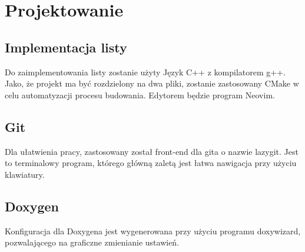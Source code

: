 	\newpage
\section{Projektowanie}		%

\subsection{Implementacja listy}

Do zaimplementowania listy zostanie użyty Język C++ z kompilatorem g++. Jako, że projekt ma być rozdzielony na dwa pliki, zostanie zastosowany CMake w celu automatyzacji procesu budowania. Edytorem będzie program Neovim. 

\subsection{Git}

Dla ułatwienia pracy, zastosowany został front-end dla gita o nazwie lazygit. Jest to terminalowy program, którego główną zaletą jest łatwa nawigacja przy użyciu klawiatury.

\subsection{Doxygen}

Konfiguracja dla Doxygena jest wygenerowana przy użyciu programu doxywizard, pozwalającego na graficzne zmienianie ustawień. 
